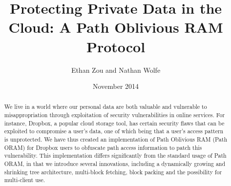 \documentclass{article}
\title{\vspace{-15mm}\fontsize{15pt}{10pt}\selectfont\textbf{Protecting Private Data in the Cloud: A Path Oblivious RAM Protocol}}
\author{Ethan Zou and Nathan Wolfe}
\date{November 2014}
\begin{document}
\maketitle

\begin{abstract}

\noindent We live in a world where our personal data are both valuable and vulnerable to misappropriation through exploitation of security vulnerabilities in online services. For instance, Dropbox, a popular cloud storage tool, has certain security flaws that can be exploited to compromise a user’s data, one of which being that a user's access pattern is unprotected. We have thus created an implementation of Path Oblivious RAM (Path ORAM) for Dropbox users to obfuscate path access information to patch this vulnerability. This implementation differs significantly from the standard usage of Path ORAM, in that we introduce several innovations, including a dynamically growing and shrinking tree architecture, multi-block fetching, block packing and the possibility for multi-client use.

\end{abstract}
\end{document}
